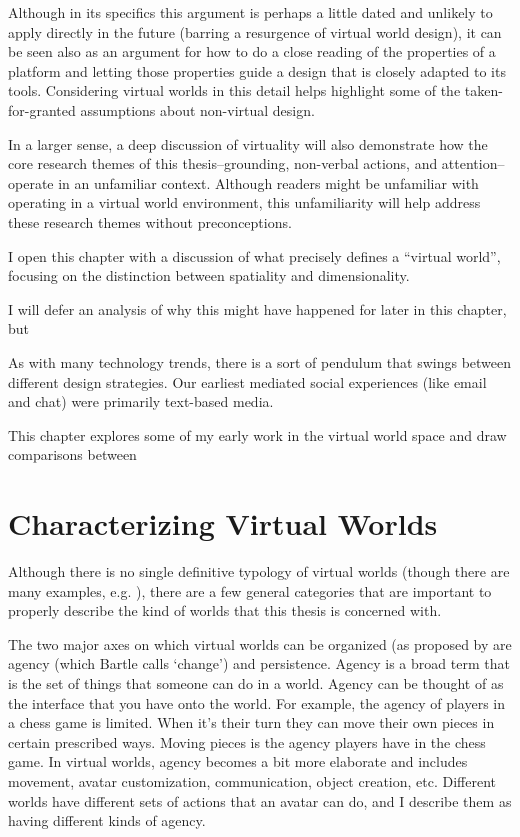 Although in its specifics this argument is perhaps a little dated and unlikely to apply directly in the future (barring a resurgence of virtual world design), it can be seen also as an argument for how to do a close reading of the properties of a platform and letting those properties guide a design that is closely adapted to its tools. Considering virtual worlds in this detail helps highlight some of the taken-for-granted assumptions about non-virtual design.

In a larger sense, a deep discussion of virtuality will also demonstrate how the core research themes of this thesis--grounding, non-verbal actions, and attention--operate in an unfamiliar context. Although readers might be unfamiliar with operating in a virtual world environment, this unfamiliarity will help address these research themes without preconceptions.

I open this chapter with a discussion of what precisely defines a ``virtual world'', focusing on the distinction between spatiality and dimensionality. 






I will defer an analysis of why this might have happened for later in this chapter, but 


As with many technology trends, there is a sort of pendulum that swings between different design strategies. Our earliest mediated social experiences (like email and chat) were primarily text-based media. 



This chapter explores some of my early work in the virtual world space and draw comparisons between 


\section{Characterizing Virtual Worlds}

Although there is no single definitive typology of virtual worlds (though there are many examples, e.g. \citep{Koster:2007wg}), there are a few general categories that are important to properly describe the kind of worlds that this thesis is concerned with.

The two major axes on which virtual worlds can be organized (as proposed by \citet{Bartle:2003up} are agency (which Bartle calls `change') and persistence. Agency is a broad term that is the set of things that someone can do in a world. Agency can be thought of as the interface that you have onto the world. For example, the agency of players in a chess game is limited. When it's their turn they can move their own pieces in certain prescribed ways. Moving pieces is the agency players have in the chess game. In virtual worlds, agency becomes a bit more elaborate and includes movement, avatar customization, communication, object creation, etc. Different worlds have different sets of actions that an avatar can do, and I describe them as having different kinds of agency.

